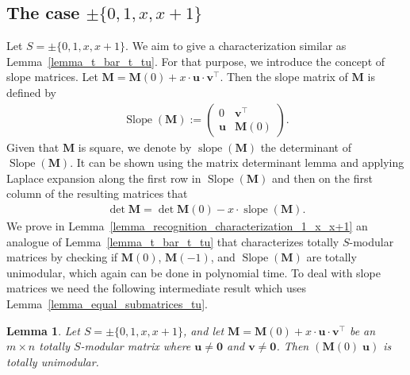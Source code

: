 \documentclass[a4paper, 11pt]{article}
\DeclareMathOperator{\slope}{slope}
\DeclareMathOperator{\slopematrix}{Slope}
\newcommand{\bv}{\bm{v}}
\newcommand{\bu}{\bm{u}}
\newcommand{\bM}{\bm{M}}
\newcommand{\indet}{x}
\newcommand{\polyS}{S}
\newcommand{\polyM}{\bM}
\newtheorem{lemma}{Lemma}
\begin{document}
	\subsection{The case $\pm \lbrace 0,1,\indet,\indet + 1\rbrace$}
	Let $\polyS = \pm \lbrace 0,1,\indet,\indet + 1\rbrace$. 
	We aim to give a characterization similar as Lemma~\ref{lemma_t_bar_t_tu}. For that purpose, we introduce the concept of slope matrices. Let $\polyM = \bM(0) + \indet\cdot\bu\cdot\bv^\top$. Then the slope matrix of $\bM$ is defined by 
	\begin{align*}
		\slopematrix(\bM) := \begin{pmatrix}
			0 & \bv^\top \\ 
			\bu & \bM(0)
		\end{pmatrix}.
	\end{align*} 
	Given that $\bM$ is square, we denote by $\slope(\bM)$ the determinant of  $\slopematrix(\bM)$. It can be shown using the matrix determinant lemma and applying Laplace expansion along the first row in $\slopematrix(\bM)$ and then on the first column of the resulting matrices that
	\begin{align}
		\label{eq_matrix_determinant_lemma}
		\det \polyM = \det\bM(0) - \indet\cdot\slope(\bM).
	\end{align}
	We prove in Lemma~\ref{lemma_recognition_characterization_1_x_x+1} an analogue of Lemma~\ref{lemma_t_bar_t_tu} that characterizes totally $\polyS$-modular matrices by checking if $\polyM(0)$, $\polyM(-1)$, and $\slopematrix(\polyM)$ are totally unimodular, which again can be done in polynomial time. To deal with slope matrices we need the following intermediate result which uses Lemma~\ref{lemma_equal_submatrices_tu}.
	
	\begin{lemma}
		\label{lemma_append_u_v_1_x_x+1}
		Let $\polyS = \pm \lbrace 0,1,\indet,\indet + 1\rbrace$, and let $\polyM = \bM(0) + \indet \cdot\bu\cdot\bv^\top$ be an $m\times n$ totally $\polyS$-modular matrix where $\bu\neq\bm{0}$ and $\bv\neq\bm{0}$. Then $(\bM(0) \; \bu)$ is totally unimodular.
	\end{lemma}
	
\end{document}
